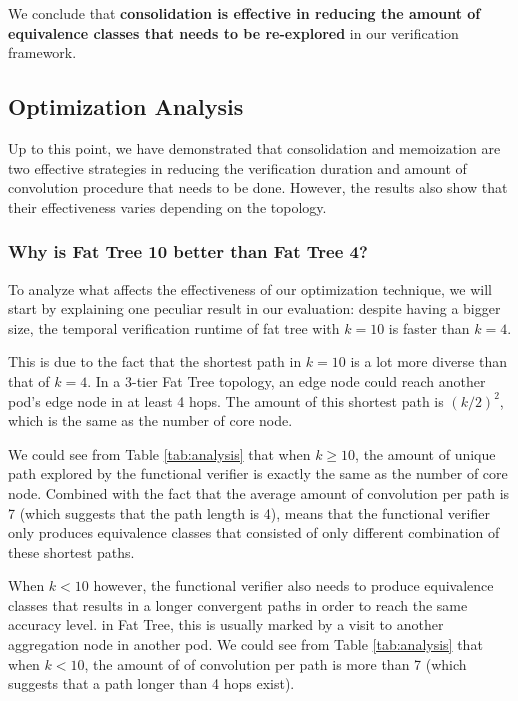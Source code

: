 We conclude that \textbf{consolidation is effective in reducing the amount of equivalence classes that 
needs to be re-explored} in our verification framework.

\subsection{Optimization Analysis}



Up to this point, we have demonstrated that consolidation and memoization are two effective strategies in 
reducing the verification duration and amount of convolution procedure that needs to be done.
However, the results also show that their effectiveness varies depending on the topology.

\subsubsection{Why is Fat Tree 10 better than Fat Tree 4?}
To analyze what affects the effectiveness of our optimization technique, we will start by explaining 
one peculiar result in our evaluation: despite having a bigger size, the temporal verification runtime 
of fat tree with $k = 10$ is faster than $k = 4$.

This is due to the fact that the shortest path in $k = 10$ is a lot more diverse than that of $k = 4$.
In a 3-tier Fat Tree topology, an edge node could reach another pod's edge node in at least 4 hops.
The amount of this shortest path is $(k/2)^2$, which is the same as the number of core node.

We could see from Table \ref{tab:analysis} that when $k \geq 10$, the amount of unique path explored by the 
functional verifier is exactly the same as the number of core node. 
Combined with the fact that the average amount of convolution per path is 7 (which suggests that the path 
length is 4), means that the functional verifier only produces equivalence classes that consisted of only 
different combination of these shortest paths.

When $k < 10$ however, the functional verifier also needs to produce equivalence classes that results 
in a longer convergent paths in order to reach the same accuracy level.
in Fat Tree, this is usually marked by a visit to another aggregation node in another pod. 
We could see from Table \ref{tab:analysis} that when $k < 10$, the amount of of convolution per path is more 
than 7 (which suggests that a path longer than 4 hops exist).

